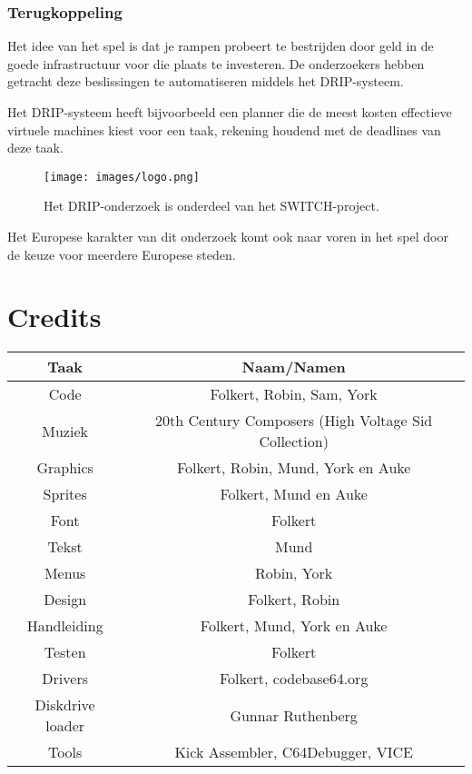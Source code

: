 \documentclass{article}
\begin{document}
\subsubsection{Terugkoppeling}
Het idee van het spel is dat je rampen probeert te bestrijden door geld in de goede infrastructuur voor die plaats te investeren. De onderzoekers hebben getracht deze beslissingen te automatiseren middels het DRIP-systeem.

Het DRIP-systeem heeft bijvoorbeeld een planner die de meest kosten effectieve virtuele machines kiest voor een taak, rekening houdend met de deadlines van deze taak.



\begin{figure}[H]
\centering
\texttt{[image: images/logo.png]}
\caption{Het DRIP-onderzoek is onderdeel van het SWITCH-project.}
\label{fig:switch}
\end{figure}
Het Europese karakter van dit onderzoek komt ook naar voren in het spel door de keuze voor meerdere Europese steden.

\section{Credits}
\begin{tabular}{c|c}
Taak & Naam/Namen \\ \hline
Code & Folkert, Robin, Sam, York \\
Muziek & 20th Century Composers (High Voltage Sid Collection) \\
Graphics & Folkert, Robin, Mund, York en Auke \\
Sprites & Folkert, Mund en Auke \\
Font & Folkert \\
Tekst & Mund \\
Menus & Robin, York \\
Design & Folkert, Robin \\
Handleiding & Folkert, Mund, York en Auke \\
Testen & Folkert \\
Drivers & Folkert, codebase64.org \\
Diskdrive loader & Gunnar Ruthenberg \\
Tools & Kick Assembler, C64Debugger, VICE
\end{tabular}



\end{document}
